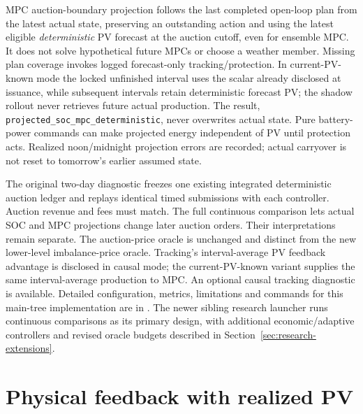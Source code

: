 \documentclass[11pt,a4paper]{article}
\begin{document}
MPC auction-boundary projection follows the last completed open-loop plan from
the latest actual state, preserving an outstanding action and using the latest
eligible \emph{deterministic} PV forecast at the auction cutoff, even for
ensemble MPC. It does not solve hypothetical future MPCs or choose a weather
member. Missing plan coverage invokes logged forecast-only tracking/protection.
In current-PV-known mode the locked unfinished interval uses the scalar already
disclosed at issuance, while subsequent intervals retain deterministic forecast
PV; the shadow rollout never retrieves future actual production.
The result, \texttt{projected\_soc\_mpc\_deterministic}, never overwrites actual
state. Pure battery-power commands can make projected energy independent of PV
until protection acts. Realized noon/midnight projection errors are recorded;
actual carryover is not reset to tomorrow's earlier assumed state.

The original two-day diagnostic freezes one existing integrated deterministic
auction ledger and replays identical timed submissions with each controller. Auction
revenue and fees must match. The full continuous comparison lets
actual SOC and MPC projections change later auction orders. Their interpretations
remain separate. The auction-price oracle is unchanged and distinct from the
new lower-level imbalance-price oracle. Tracking's interval-average PV feedback
advantage is disclosed in causal mode; the current-PV-known variant supplies
the same interval-average production to MPC. An optional causal tracking diagnostic
is available. Detailed configuration, metrics, limitations and commands for this main-tree
implementation are in . The newer sibling
research launcher runs continuous comparisons as its primary design, with
additional economic/adaptive controllers and revised oracle budgets described
in Section~\ref{sec:research-extensions}.

\section{Physical feedback with realized PV}
\end{document}
